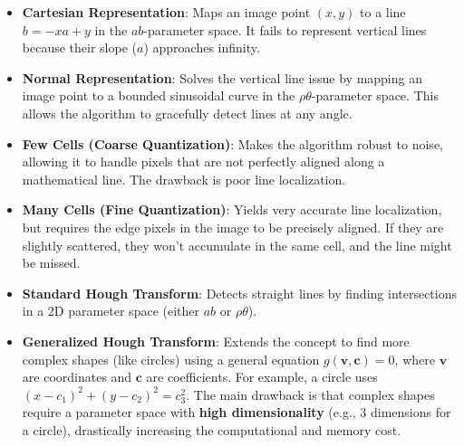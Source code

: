 {\begin{itemize}
    \item \textbf{Cartesian Representation}: Maps an image point $(x, y)$ to a line $b = -xa + y$ in the $ab$-parameter space. It fails to represent vertical lines because their slope ($a$) approaches infinity.
    \item \textbf{Normal Representation}: Solves the vertical line issue by mapping an image point to a bounded sinusoidal curve in the $\rho\theta$-parameter space. This allows the algorithm to gracefully detect lines at any angle.
\end{itemize}}

{\begin{itemize}
    \item \textbf{Few Cells (Coarse Quantization)}: Makes the algorithm robust to noise, allowing it to handle pixels that are not perfectly aligned along a mathematical line. The drawback is poor line localization.
    \item \textbf{Many Cells (Fine Quantization)}: Yields very accurate line localization, but requires the edge pixels in the image to be precisely aligned. If they are slightly scattered, they won't accumulate in the same cell, and the line might be missed.
\end{itemize}}

{\begin{itemize}
    \item \textbf{Standard Hough Transform}: Detects straight lines by finding intersections in a 2D parameter space (either $ab$ or $\rho\theta$).
    \item \textbf{Generalized Hough Transform}: Extends the concept to find more complex shapes (like circles) using a general equation $g(\boldsymbol{v}, \boldsymbol{c}) = 0$, where $\boldsymbol{v}$ are coordinates and $\boldsymbol{c}$ are coefficients. For example, a circle uses $(x - c_1)^2 + (y - c_2)^2 = c_3^2$. The main drawback is that complex shapes require a parameter space with \textbf{high dimensionality} (e.g., 3 dimensions for a circle), drastically increasing the computational and memory cost.
\end{itemize}}

